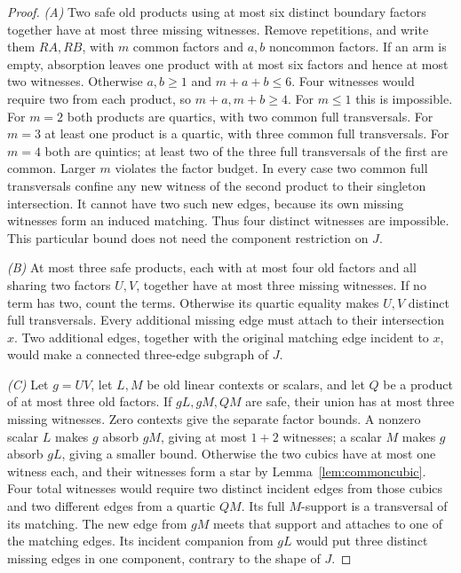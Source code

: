 \documentclass[11pt]{article}
\theoremstyle{definition}
\theoremstyle{remark}
\begin{document}
\begin{proof}
\emph{(A)} Two safe old products using at most six distinct boundary factors together have at most three missing witnesses. Remove repetitions, and write them $RA,RB$, with $m$ common factors and $a,b$ noncommon factors. If an arm is empty, absorption leaves one product with at most six factors and hence at most two witnesses. Otherwise $a,b\ge1$ and $m+a+b\le6$. Four witnesses would require two from each product, so $m+a,m+b\ge4$. For $m\le1$ this is impossible. For $m=2$ both products are quartics, with two common full transversals. For $m=3$ at least one product is a quartic, with three common full transversals. For $m=4$ both are quintics; at least two of the three full transversals of the first are common. Larger $m$ violates the factor budget. In every case two common full transversals confine any new witness of the second product to their singleton intersection. It cannot have two such new edges, because its own missing witnesses form an induced matching. Thus four distinct witnesses are impossible. This particular bound does not need the component restriction on $J$.

\emph{(B)} At most three safe products, each with at most four old factors and all sharing two factors $U,V$, together have at most three missing witnesses. If no term has two, count the terms. Otherwise its quartic equality makes $U,V$ distinct full transversals. Every additional missing edge must attach to their intersection $x$. Two additional edges, together with the original matching edge incident to $x$, would make a connected three-edge subgraph of $J$.

\emph{(C)} Let $g=UV$, let $L,M$ be old linear contexts or scalars, and let $Q$ be a product of at most three old factors. If $gL,gM,QM$ are safe, their union has at most three missing witnesses. Zero contexts give the separate factor bounds. A nonzero scalar $L$ makes $g$ absorb $gM$, giving at most $1+2$ witnesses; a scalar $M$ makes $g$ absorb $gL$, giving a smaller bound. Otherwise the two cubics have at most one witness each, and their witnesses form a star by Lemma~\ref{lem:commoncubic}. Four total witnesses would require two distinct incident edges from those cubics and two different edges from a quartic $QM$. Its full $M$-support is a transversal of its matching. The new edge from $gM$ meets that support and attaches to one of the matching edges. Its incident companion from $gL$ would put three distinct missing edges in one component, contrary to the shape of $J$.


\end{proof}
\end{document}
